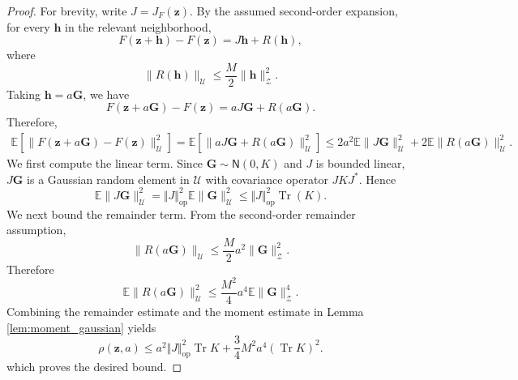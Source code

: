 \documentclass[11pt]{article}
\begin{document}
\begin{proof}
For brevity, write $J=J_{F}(\mathbf z)$. By the assumed second-order expansion, for every $\mathbf h$ in the relevant neighborhood,
\[
    F(\mathbf z+\mathbf h)-F(\mathbf z)
    =J\mathbf h+R(\mathbf h),
\]
where
\[
    \|R(\mathbf h)\|_{\mathcal U}\le\frac{M}{2}\|\mathbf h\|_{\mathcal Z}^2.
\]
Taking $\mathbf h=a\mathbf G$, we have
\[
    F(\mathbf z+a\mathbf G)-F(\mathbf z) = aJ\mathbf G+R(a\mathbf G).
\]
Therefore,
\[
\begin{aligned}
    \mathbb E\left[\|F(\mathbf z+a\mathbf G)-F(\mathbf z)\|_{\mathcal U}^2\right]=\mathbb E
    \left[\|aJ\mathbf G+R(a\mathbf G)\|_{\mathcal U}^2
    \right]\le 2a^2\mathbb E\|J\mathbf G\|_{\mathcal U}^2
    +2\mathbb E\|R(a\mathbf G)\|_{\mathcal U}^2.
\end{aligned}
\]
We first compute the linear term. Since $\mathbf G\sim \mathsf N(0,K)$ and $J$ is bounded linear, $J\mathbf G$ is a Gaussian random element in $\mathcal U$ with covariance operator $J K J^*$.
Hence
\[
    \mathbb E\|J\mathbf G\|_{\mathcal U}^2
    =\Vert J\Vert_\mathrm{op}^2\mathbb E\|\mathbf G\|_{\mathcal U}^2\leq\Vert J\Vert_\mathrm{op}^2\operatorname{Tr}(K).
\]
We next bound the remainder term. From the second-order remainder assumption,
\[
    \|R(a\mathbf G)\|_{\mathcal U}\le\frac{M}{2}a^2\|\mathbf G\|_{\mathcal Z}^2.
\]
Therefore
\[
\mathbb E\|R(a\mathbf G)\|_{\mathcal U}^2\le\frac{M^2}{4}a^4\mathbb E\|\mathbf G\|_{\mathcal Z}^4.
\]
Combining the remainder estimate and the moment estimate in Lemma \ref{lem:moment_gaussian} yields
\[
    \rho(\mathbf z,a)\le
    a^2\Vert J\Vert_\mathrm{op}^2\operatorname{Tr} K+\frac{3}{4}M^2a^4(\operatorname{Tr} K)^2.
\]
which proves the desired bound.
\end{proof}
\end{document}
